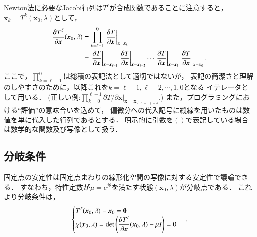 \documentclass[a4paper,dvipdfmx]{jsarticle}
\newcommand{\pdiff}[3]{
 \ifnum #1<1
 \text{Args[0] should be more than 1} \else{
 \ifnum #1=1 \displaystyle \frac{\partial #2}{\partial #3}\else
 \displaystyle \frac{\partial^{#1} #2}{\partial #3^{#1}}\fi
 }\fi
}
\begin{document}
Newton法に必要なJacobi行列は$T^\ell$が合成関数であることに注意すると，
$\bm{x}_k = T^k(\bm{x}_0, \lambda)$として，
\begin{align}
\begin{split}    
    \pdiff{1}{T^\ell}{\bm{x}}(\bm{x}_0, \lambda) &= 
    \prod_{k=\ell-1}^{0} \left.\pdiff{1}{T}{\bm{x}}\right|_{\bm{x}=\bm{x}_k}\\
    &= \left.\pdiff{1}{T}{\bm{x}}\right|_{\bm{x}=\bm{x}_{\ell-1}}
    \left.\pdiff{1}{T}{\bm{x}}\right|_{\bm{x}=\bm{x}_{\ell-2}}
    \cdots
    \left.\pdiff{1}{T}{\bm{x}}\right|_{\bm{x}=\bm{x}_1}
    \left.\pdiff{1}{T}{\bm{x}}\right|_{\bm{x}=\bm{x}_0}.
\end{split}
\label{eq:dTldx}
\end{align}
ここで，$\prod_{k=\ell-1}^{0}$は総積の表記法として適切ではないが，
表記の簡潔さと理解のしやすさのために，以降これを$k = \ell-1, \ell-2, \cdots, 1, 0$となる
イテレータとして用いる．
(正しい例:$\prod_{k=0}^{\ell-1}\partial T/\partial \bm{x}|_{\bm{x}=\bm{x}_{(\ell-1)-k}}$.)
また，プログラミングにおける``評価''の意味合いを込めて，
偏微分への代入記号に縦線を用いたものは数値を単に代入した行列であるとする．
明示的に引数を$()$で表記している場合は数学的な関数及び写像として扱う．

\subsection{分岐条件}
固定点の安定性は固定点まわりの線形化空間の写像に対する安定性で議論できる．
すなわち，特性定数が$\mu=e^{j\theta}$を満たす状態$(\bm{x}_0, \lambda)$が分岐点である．
これより分岐条件は，
\begin{align}
\begin{cases}
    T^\ell(\bm{x}_0, \lambda) - \bm{x}_0 = \bm{0}\\
    \chi(\bm{x}_0, \lambda) = \mathrm{det}\left(\pdiff{1}{T^\ell}{\bm{x}}(\bm{x}_0, \lambda) - \mu I\right) = 0
\end{cases}.
\label{eq:bif_cond}
\end{align}
\end{document}
